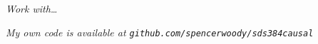 \documentclass[11pt,letter]{article}
\begin{document}
\maketitle

\newpage


\emph{Work with\ldots}

\emph{My own code is available at
  \texttt{github.com/spencerwoody/sds384causal}}


















% 





% 
 




\begin{raggedright}

\end{raggedright}


\end{document}
